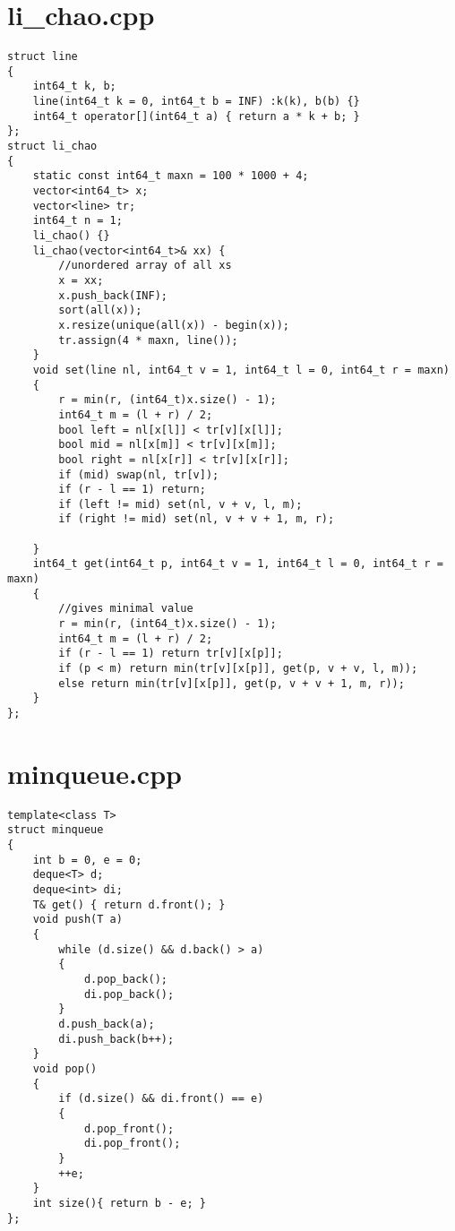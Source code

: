 \documentclass[a4paper,12pt]{report}
\begin{document}
\section{li_chao.cpp}
\begin{lstlisting}
struct line
{
    int64_t k, b;
    line(int64_t k = 0, int64_t b = INF) :k(k), b(b) {}
    int64_t operator[](int64_t a) { return a * k + b; }
};
struct li_chao
{
    static const int64_t maxn = 100 * 1000 + 4;
    vector<int64_t> x;
    vector<line> tr;
    int64_t n = 1;
    li_chao() {}
    li_chao(vector<int64_t>& xx) { 
        //unordered array of all xs
        x = xx;
        x.push_back(INF);
        sort(all(x));
        x.resize(unique(all(x)) - begin(x));
        tr.assign(4 * maxn, line());
    }
    void set(line nl, int64_t v = 1, int64_t l = 0, int64_t r = maxn)
    {
        r = min(r, (int64_t)x.size() - 1);
        int64_t m = (l + r) / 2;
        bool left = nl[x[l]] < tr[v][x[l]];
        bool mid = nl[x[m]] < tr[v][x[m]];
        bool right = nl[x[r]] < tr[v][x[r]];
        if (mid) swap(nl, tr[v]);
        if (r - l == 1) return;
        if (left != mid) set(nl, v + v, l, m);
        if (right != mid) set(nl, v + v + 1, m, r);

    }
    int64_t get(int64_t p, int64_t v = 1, int64_t l = 0, int64_t r = maxn)
    {
        //gives minimal value
        r = min(r, (int64_t)x.size() - 1);
        int64_t m = (l + r) / 2;
        if (r - l == 1) return tr[v][x[p]];
        if (p < m) return min(tr[v][x[p]], get(p, v + v, l, m));
        else return min(tr[v][x[p]], get(p, v + v + 1, m, r));
    }
};

\end{lstlisting}


\section{minqueue.cpp}
\begin{lstlisting}
template<class T>
struct minqueue
{
    int b = 0, e = 0;
    deque<T> d;
    deque<int> di;
    T& get() { return d.front(); }
    void push(T a)
    {
        while (d.size() && d.back() > a)
        {
            d.pop_back();
            di.pop_back();
        }
        d.push_back(a);
        di.push_back(b++);
    }
    void pop()
    {
        if (d.size() && di.front() == e)
        {
            d.pop_front();
            di.pop_front();
        }
        ++e;
    }
	int size(){ return b - e; }
};

\end{lstlisting}
\end{document}
